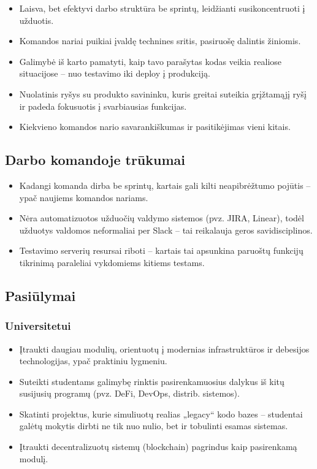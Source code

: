 \documentclass[]{VUMIFTemplateClass}
\begin{document}
\begin{itemize}
    \item Laisva, bet efektyvi darbo struktūra be sprintų, leidžianti susikoncentruoti į užduotis.
    \item Komandos nariai puikiai įvaldę technines sritis, pasiruošę dalintis žiniomis.
    \item Galimybė iš karto pamatyti, kaip tavo parašytas kodas veikia realiose situacijose – nuo testavimo iki deploy į produkciją.
    \item Nuolatinis ryšys su produkto savininku, kuris greitai suteikia grįžtamąjį ryšį ir padeda fokusuotis į svarbiausias funkcijas.
    \item Kiekvieno komandos nario savarankiškumas ir pasitikėjimas vieni kitais.
\end{itemize}

\subsection{Darbo komandoje trūkumai}

\begin{itemize}
    \item Kadangi komanda dirba be sprintų, kartais gali kilti neapibrėžtumo pojūtis – ypač naujiems komandos nariams.
    \item Nėra automatizuotos užduočių valdymo sistemos (pvz. JIRA, Linear), todėl užduotys valdomos neformaliai per Slack – tai reikalauja geros savidisciplinos.
    \item Testavimo serverių resursai riboti – kartais tai apsunkina paruoštų funkcijų tikrinimą paraleliai vykdomiems kitiems testams.
\end{itemize}

\subsection{Pasiūlymai}

\subsubsection{Universitetui}

\begin{itemize}
    \item Įtraukti daugiau modulių, orientuotų į modernias infrastruktūros ir debesijos technologijas, ypač praktiniu lygmeniu.
    \item Suteikti studentams galimybę rinktis pasirenkamuosius dalykus iš kitų susijusių programų (pvz. DeFi, DevOps, distrib. sistemos).
    \item Skatinti projektus, kurie simuliuotų realias „legacy“ kodo bazes – studentai galėtų mokytis dirbti ne tik nuo nulio, bet ir tobulinti esamas sistemas.
    \item Įtraukti decentralizuotų sistemų (blockchain) pagrindus kaip pasirenkamą modulį.
\end{itemize}
\end{document}
